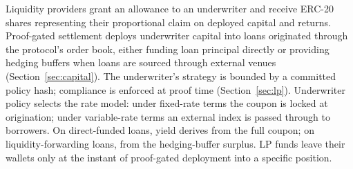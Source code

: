 Liquidity providers grant an allowance to an underwriter and receive ERC-20 shares representing their proportional claim on deployed capital and returns. Proof-gated settlement deploys underwriter capital into loans originated through the protocol's order book, either funding loan principal directly or providing hedging buffers when loans are sourced through external venues (Section~\ref{sec:capital}). The underwriter's strategy is bounded by a committed policy hash; compliance is enforced at proof time (Section~\ref{sec:lp}). Underwriter policy selects the rate model: under fixed-rate terms the coupon is locked at origination; under variable-rate terms an external index is passed through to borrowers. On direct-funded loans, yield derives from the full coupon; on liquidity-forwarding loans, from the hedging-buffer surplus. LP funds leave their wallets only at the instant of proof-gated deployment into a specific position.

